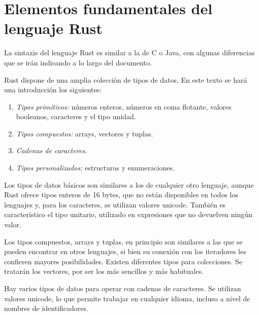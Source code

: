 \chapter{Elementos fundamentales del lenguaje Rust}
\label{ch_elementos_rust}
\IndiceCapitulo
\begin{Resumen}
La sintaxis del lenguaje Rust es similar a la de C o Java, con algunas diferencias que se irán indicando a lo largo del documento.

\smallskip

Rust dispone de una amplia colección de tipos de datos. En este texto se hará una introducción los siguientes:

\begin{enumerate}
   \item \textit{Tipos primitivos:} números enteros, números en coma flotante, valores booleanos, caracteres y el tipo unidad.
   \item \textit{Tipos compuestos:} arrays, vectores y tuplas.
   \item  \textit{Cadenas de caracteres}.
   \item \textit{Tipos personalizados:} estructuras y enumeraciones.
\end{enumerate}

Los tipos de datos básicos son similares a los de cualquier otro lenguaje, aunque Rust ofrece tipos enteros de 16 bytes, que no están disponibles en todos los lenguajes y, para los caracteres, se utilizan valores unicode. También es característico el tipo unitario, utilizado en expresiones que no devuelven ningún valor.

\smallskip

Los tipos compuestos, arrays y tuplas, en principio son similares a las que se pueden encontrar en otros lenguajes, si bien su conexión con los iteradores les confieren mayores posibilidades. Existen diferentes tipos para colecciones. Se tratarán los vectores, por ser los más sencillos y más habituales.

\smallskip

Hay varios tipos de datos para operar con cadenas de caracteres. Se utilizan valores unicode, lo que permite trabajar en cualquier idioma, incluso a nivel de nombres de identificadores. 

\smallskip


\end{Resumen}
